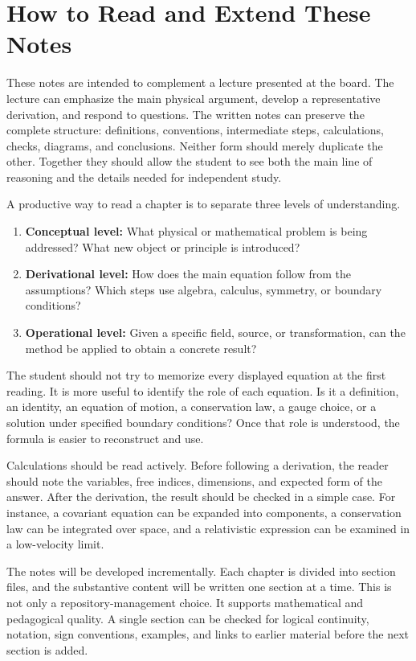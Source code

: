 \section*{How to Read and Extend These Notes}

These notes are intended to complement a lecture presented at the board. The lecture can emphasize the main physical argument, develop a representative derivation, and respond to questions. The written notes can preserve the complete structure: definitions, conventions, intermediate steps, calculations, checks, diagrams, and conclusions. Neither form should merely duplicate the other. Together they should allow the student to see both the main line of reasoning and the details needed for independent study.

A productive way to read a chapter is to separate three levels of understanding.

\begin{enumerate}
    \item \textbf{Conceptual level:} What physical or mathematical problem is being addressed? What new object or principle is introduced?
    \item \textbf{Derivational level:} How does the main equation follow from the assumptions? Which steps use algebra, calculus, symmetry, or boundary conditions?
    \item \textbf{Operational level:} Given a specific field, source, or transformation, can the method be applied to obtain a concrete result?
\end{enumerate}

The student should not try to memorize every displayed equation at the first reading. It is more useful to identify the role of each equation. Is it a definition, an identity, an equation of motion, a conservation law, a gauge choice, or a solution under specified boundary conditions? Once that role is understood, the formula is easier to reconstruct and use.

Calculations should be read actively. Before following a derivation, the reader should note the variables, free indices, dimensions, and expected form of the answer. After the derivation, the result should be checked in a simple case. For instance, a covariant equation can be expanded into components, a conservation law can be integrated over space, and a relativistic expression can be examined in a low-velocity limit.

The notes will be developed incrementally. Each chapter is divided into section files, and the substantive content will be written one section at a time. This is not only a repository-management choice. It supports mathematical and pedagogical quality. A single section can be checked for logical continuity, notation, sign conventions, examples, and links to earlier material before the next section is added.

